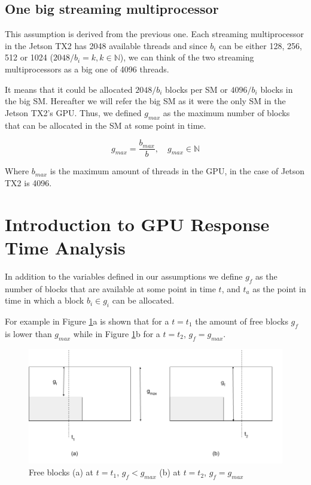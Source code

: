 \documentclass[
  12pt,
  a4paperpaper,
]{report}
\begin{document}
\hypertarget{one-big-streaming-multiprocessor}{%
\subsection{One big streaming
multiprocessor}\label{one-big-streaming-multiprocessor}}

This assumption is derived from the previous one. Each streaming
multiprocessor in the Jetson TX2 has 2048 available threads and since
\(b_i\) can be either 128, 256, 512 or 1024
(\(2048/ b_i = k, k \in \mathbb{N}\)), we can think of the two streaming
multiprocessors as a big one of 4096 threads.

It means that it could be allocated \(2048/b_i\) blocks per SM or
\(4096/b_i\) blocks in the big SM. Hereafter we will refer the big SM as
it were the only SM in the Jetson TX2's GPU. Thus, we defined
\(g_{max}\) as the maximum number of blocks that can be allocated in the
SM at some point in time.

\begin{equation} 
g_{max} = \frac{b_{max}}{b}, \quad  g_{max} \in \mathbb{N}
\label{eq:max_grid}
\end{equation}

Where \(b_{max}\) is the maximum amount of threads in the GPU, in the
case of Jetson TX2 is 4096.

\hypertarget{introduction-to-gpu-response-time-analysis}{%
\section{Introduction to GPU Response Time
Analysis}\label{introduction-to-gpu-response-time-analysis}}

In addition to the variables defined in our assumptions we define
\(g_{f}\) as the number of blocks that are available at some point in
time \(t\), and \(t_a\) as the point in time in which a block
\(b_i \in g_i\) can be allocated.

For example in Figure \ref{img:free_blocks}a is shown that for a
\(t=t_1\) the amount of free blocks \(g_{f}\) is lower than \(g_{max}\)
while in Figure \ref{img:free_blocks}b for a \(t=t_2\),
\(g_{f} = g_{max}\).

\begin{figure}
\centering
\includegraphics{source/figures/free_blocks.png}
\caption{Free blocks (a) at \(t=t_1\), \(g_f < g_{max}\) (b) at
\(t=t_2\), \(g_f = g_{max}\) \label{img:free_blocks}}
\end{figure}
\end{document}
